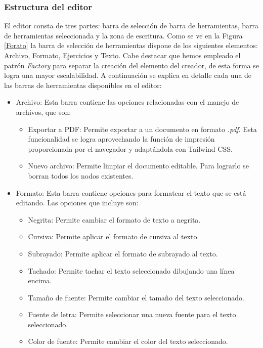 \subsubsection{Estructura del editor}
El editor consta de tres partes: barra de selección de barra de herramientas, barra de herramientas seleccionada y la zona de escritura. Como se ve en la Figura \ref{Forato} la barra de selección de herramientas dispone de los siguientes elementos: Archivo, Formato, Ejercicios y Texto. Cabe destacar que hemos empleado el patrón \textit{Factory} para separar la creación del elemento del creador, de esta forma se logra una mayor escalabilidad.
A continuación se explica en detalle cada una de las barras de herramientas disponibles en el editor:

\begin{itemize}
  \item Archivo: Esta barra contiene las opciones relacionadas con el manejo de archivos, que son:
        \begin{itemize}
          \item Exportar a PDF: Permite exportar a un documento en formato \textit{.pdf}. Esta funcionalidad se logra aprovechando la función de impresión proporcionada por el navegador y adaptándola con Tailwind CSS.
          \item Nuevo archivo: Permite limpiar el documento editable. Para lograrlo se borran todos los nodos existentes.
        \end{itemize}
  \item Formato: Esta barra contiene opciones para formatear el texto que se está editando. Las opciones que incluye son:
        \begin{itemize}
          \item Negrita: Permite cambiar el formato de texto a negrita.
          \item Cursiva: Permite aplicar el formato de cursiva al texto.
          \item Subrayado: Permite aplicar el formato de subrayado al texto.
          \item Tachado: Permite tachar el texto seleccionado dibujando una línea encima.
          \item Tamaño de fuente: Permite cambiar el tamaño del texto seleccionado.
          \item Fuente de letra: Permite seleccionar una nueva fuente para el texto seleccionado.
          \item Color de fuente: Permite cambiar el color del texto seleccionado.

\end{itemize}
\end{itemize}
